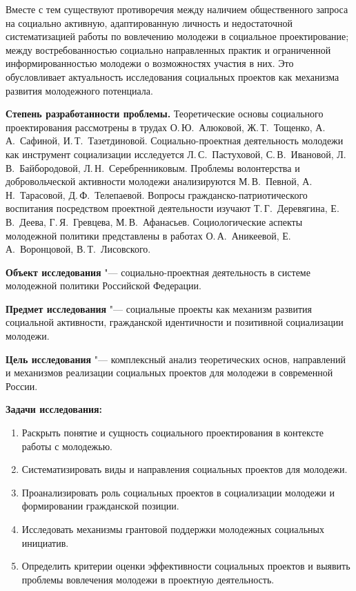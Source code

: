 \documentclass[14pt,a4paper]{extarticle}
\begin{document}
Вместе с тем существуют противоречия между наличием общественного запроса на социально активную, адаптированную личность и недостаточной систематизацией работы по вовлечению молодежи в социальное проектирование; между востребованностью социально направленных практик и ограниченной информированностью молодежи о возможностях участия в них. Это обусловливает актуальность исследования социальных проектов как механизма развития молодежного потенциала.

\textbf{Степень разработанности проблемы.} Теоретические основы социального проектирования рассмотрены в трудах О.\,Ю.~Алюковой, Ж.\,Т.~Тощенко, А.\,А.~Сафиной, И.\,Т.~Тазетдиновой. Социально-проектная деятельность молодежи как инструмент социализации исследуется Л.\,С.~Пастуховой, С.\,В.~Ивановой, Л.\,В.~Байбородовой, Л.\,Н.~Серебренниковым. Проблемы волонтерства и добровольческой активности молодежи анализируются М.\,В.~Певной, А.\,Н.~Тарасовой, Д.\,Ф.~Телепаевой. Вопросы гражданско-патриотического воспитания посредством проектной деятельности изучают Т.\,Г.~Деревягина, Е.\,В.~Деева, Г.\,Я.~Гревцева, М.\,В.~Афанасьев. Социологические аспекты молодежной политики представлены в работах О.\,А.~Аникеевой, Е.\,А.~Воронцовой, В.\,Т.~Лисовского.

\textbf{Объект исследования} "--- социально-проектная деятельность в системе молодежной политики Российской Федерации.

\textbf{Предмет исследования} "--- социальные проекты как механизм развития социальной активности, гражданской идентичности и позитивной социализации молодежи.

\textbf{Цель исследования} "--- комплексный анализ теоретических основ, направлений и механизмов реализации социальных проектов для молодежи в современной России.

\textbf{Задачи исследования:}
\begin{enumerate}[leftmargin=\parindent, labelsep=0.5em, itemsep=0pt, parsep=0pt]
    \item Раскрыть понятие и сущность социального проектирования в контексте работы с молодежью.
    \item Систематизировать виды и направления социальных проектов для молодежи.
    \item Проанализировать роль социальных проектов в социализации молодежи и формировании гражданской позиции.
    \item Исследовать механизмы грантовой поддержки молодежных социальных инициатив.
    \item Определить критерии оценки эффективности социальных проектов и выявить проблемы вовлечения молодежи в проектную деятельность.
\end{enumerate}
\end{document}
